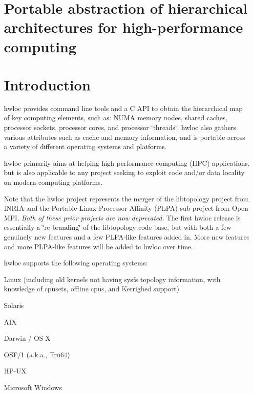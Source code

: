 \section*{Portable abstraction of hierarchical architectures for high-\/performance computing}





 \hypertarget{index_Introduction}{}\section{Introduction}\label{index_Introduction}
hwloc provides command line tools and a C API to obtain the hierarchical map of key computing elements, such as: NUMA memory nodes, shared caches, processor sockets, processor cores, and processor \char`\"{}threads\char`\"{}. hwloc also gathers various attributes such as cache and memory information, and is portable across a variety of different operating systems and platforms.

hwloc primarily aims at helping high-\/performance computing (HPC) applications, but is also applicable to any project seeking to exploit code and/or data locality on modern computing platforms.

Note that the hwloc project represents the merger of the libtopology project from INRIA and the Portable Linux Processor Affinity (PLPA) sub-\/project from Open MPI. {\itshape Both of these prior projects are now deprecated.\/} The first hwloc release is essentially a \char`\"{}re-\/branding\char`\"{} of the libtopology code base, but with both a few genuinely new features and a few PLPA-\/like features added in. More new features and more PLPA-\/like features will be added to hwloc over time.

hwloc supports the following operating systems:


\begin{DoxyItemize}
\item Linux (including old kernels not having sysfs topology information, with knowledge of cpusets, offline cpus, and Kerrighed support) 
\item Solaris 
\item AIX 
\item Darwin / OS X 
\item OSF/1 (a.k.a., Tru64) 
\item HP-\/UX 
\item Microsoft Windows 
\end{DoxyItemize}

